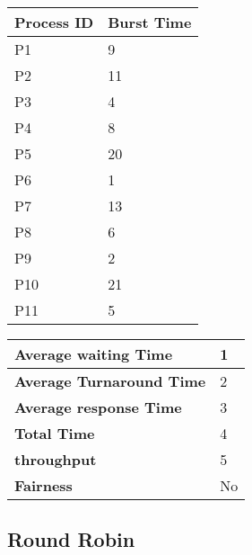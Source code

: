 \documentclass{article}
\begin{document}
\vspace{\baselineskip}
\hspace{1cm}
\begin{minipage}[t]{0.3\textwidth}
    \begin{tabularx}{\textwidth}{|l|X|}
    \hline
    \textbf{Process ID} & \textbf{Burst Time}\\
    \hline
    P1 & 9 \\
    P2 & 11 \\
    P3 & 4 \\
    P4 & 8 \\
    P5 & 20 \\
    P6 & 1 \\
    P7 & 13 \\
    P8 & 6 \\
    P9 & 2 \\
    P10 & 21 \\
    P11 & 5 \\
    \hline
    \end{tabularx}
\end{minipage}
\hspace{2cm}
\begin{minipage}[t!]{0.35\textwidth}
    \begin{tabularx}{\textwidth}{|l|X|}
    \hline
    \textbf{Average waiting Time} & 1 \\
    \hline
    \textbf{Average Turnaround Time} & 2 \\
    \hline
    \textbf{Average response Time} & 3 \\
    \hline
    \textbf{Total Time} & 4 \\
    \hline
    \textbf{throughput} & 5 \\
    \hline
    \textbf{Fairness} & No \\
    \hline
    \end{tabularx}
\end{minipage}

\subsection{Round Robin}
\end{document}

